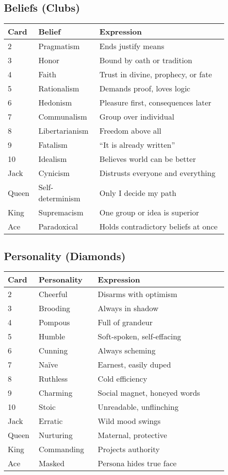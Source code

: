 \documentclass[12pt]{book}
\begin{document}
\subsection*{Beliefs (Clubs)}
\begin{longtable}{|p{0.1\linewidth}|p{0.25\linewidth}|p{0.55\linewidth}|}
\hline
\textbf{Card} & \textbf{Belief} & \textbf{Expression} \\
\hline
2 & Pragmatism & Ends justify means \\
3 & Honor & Bound by oath or tradition \\
4 & Faith & Trust in divine, prophecy, or fate \\
5 & Rationalism & Demands proof, loves logic \\
6 & Hedonism & Pleasure first, consequences later \\
7 & Communalism & Group over individual \\
8 & Libertarianism & Freedom above all \\
9 & Fatalism & ``It is already written'' \\
10 & Idealism & Believes world can be better \\
Jack & Cynicism & Distrusts everyone and everything \\
Queen & Self-determinism & Only I decide my path \\
King & Supremacism & One group or idea is superior \\
Ace & Paradoxical & Holds contradictory beliefs at once \\
\hline
\end{longtable}

\subsection*{Personality (Diamonds)}
\begin{longtable}{|p{0.1\linewidth}|p{0.25\linewidth}|p{0.55\linewidth}|}
\hline
\textbf{Card} & \textbf{Personality} & \textbf{Expression} \\
\hline
2 & Cheerful & Disarms with optimism \\
3 & Brooding & Always in shadow \\
4 & Pompous & Full of grandeur \\
5 & Humble & Soft-spoken, self-effacing \\
6 & Cunning & Always scheming \\
7 & Naïve & Earnest, easily duped \\
8 & Ruthless & Cold efficiency \\
9 & Charming & Social magnet, honeyed words \\
10 & Stoic & Unreadable, unflinching \\
Jack & Erratic & Wild mood swings \\
Queen & Nurturing & Maternal, protective \\
King & Commanding & Projects authority \\
Ace & Masked & Persona hides true face \\
\hline
\end{longtable}
\end{document}
